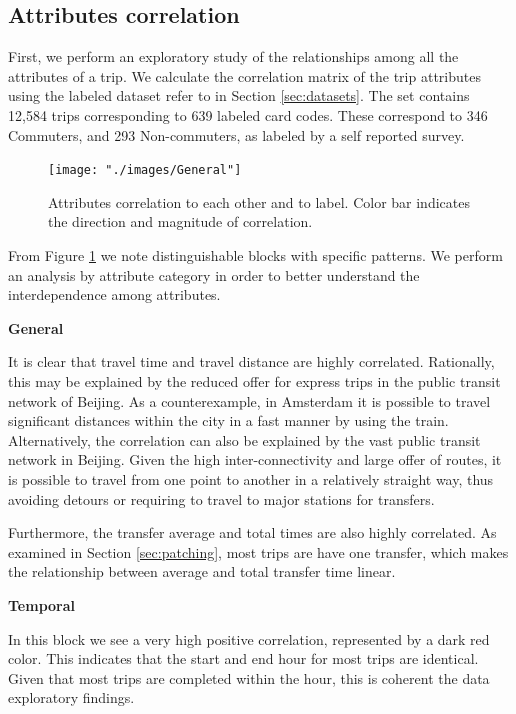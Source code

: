 \documentclass{article}
\begin{document}
\subsection{Attributes correlation} 
First, we perform an exploratory study of the relationships among all the attributes of a trip. We calculate the correlation matrix of the trip attributes using the labeled dataset refer to in Section \ref{sec:datasets}. The set contains 12,584 trips corresponding to 639 labeled card codes. These correspond to 346 Commuters, and 293 Non-commuters, as labeled by a self reported survey. 

\begin{figure}[H]
  \centering
  \texttt{[image: "./images/General"]}
  \caption{Attributes correlation to each other and to label. Color bar indicates the direction and magnitude of correlation.}
  \label{fig:classification/correlation}
\end{figure}

From Figure \ref{fig:classification/correlation} we note distinguishable blocks with specific patterns. We perform an analysis by attribute category in order to better understand the interdependence among attributes.

\textbf{General} 

It is clear that travel time and travel distance are highly correlated. Rationally, this may be explained by the reduced offer for express trips in the public transit network of Beijing. As a counterexample, in Amsterdam it is possible to travel significant distances within the city in a fast manner by using the train. Alternatively, the correlation can also be explained by the vast public transit network in Beijing. Given the high inter-connectivity and large offer of routes, it is possible to travel from one point to another in a relatively straight way, thus avoiding detours or requiring to travel to major stations for transfers. 
 
Furthermore, the transfer average and total times are also highly correlated. As examined in Section \ref{sec:patching}, most trips are have one transfer, which makes the relationship between average and total transfer time linear.

\textbf{Temporal}

In this block we see a very high positive correlation, represented by a dark red color. This indicates that the start and end hour for most trips are identical. Given that most trips are completed within the hour, this is coherent the data exploratory findings. 
\end{document}
